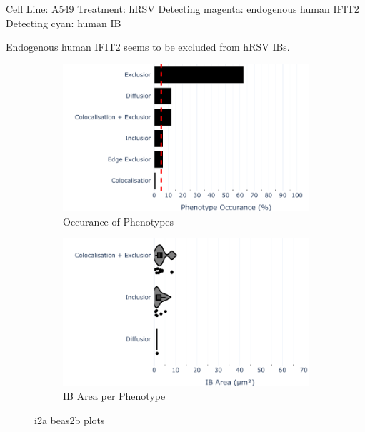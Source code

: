 Cell Line: A549 \newline
Treatment: hRSV \newline
Detecting magenta: endogenous human IFIT2  \newline
Detecting cyan: human IB \newline

Endogenous human IFIT2 seems to be excluded from hRSV IBs.

\begin{figure}
    \begin{subfigure}{0.5\textwidth}
        \includegraphics[width=1\linewidth]{10. Chapter 5/Figs/01. Infection/01. IFIT2A/10. bar_i2a_beas2b.pdf} 
        \caption[]{Occurance of Phenotypes}
    \end{subfigure}
    \begin{subfigure}{0.5\textwidth}
        \includegraphics[width=1\linewidth]{10. Chapter 5/Figs/01. Infection/01. IFIT2A/11. violin_i2a_beas2b.pdf}
        \caption[]{IB Area per Phenotype}
    \end{subfigure}
    \caption[i2a beas2b plots]{i2a beas2b plots}
    \label{fig:i2a beas2b plots}
\end{figure}

